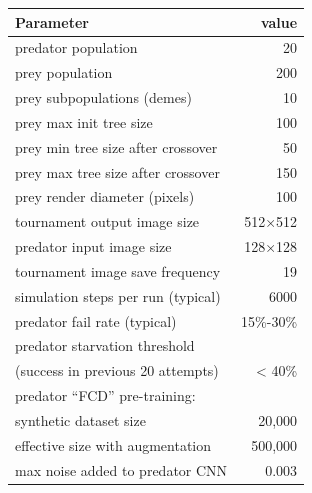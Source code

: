 \documentclass[acmtog]{acmart}
\begin{document}
\begin{adjustwidth}{1cm}{0cm}
    \vspace{0.3cm}
    \begin{tabular}{ |l|r| }
        \hline
        \textbf{Parameter} & \textbf{value} \\ 
        \hline
        predator population & 20 \\ 
        prey population & 200 \\ 
        prey subpopulations (demes) & 10 \\
        prey max init tree size & 100 \\
        prey min tree size after crossover & 50 \\
        prey max tree size after crossover & 150 \\
        \hline
        prey render diameter (pixels) & 100 \\ 
        tournament output image size & 512×512 \\ 
        predator input image size & 128×128 \\ 
        \hline
        tournament image save frequency & 19 \\
        simulation steps per run (typical) & 6000 \\
        predator fail rate (typical) & 15\%-30\% \\
        predator starvation threshold & \\
        \hspace{0.2cm}(success in previous 20 attempts) & < 40\% \\ 
        \hline
        predator “FCD” pre-training: & \\
        \hspace{0.2cm} synthetic dataset size & 20,000 \\
        \hspace{0.2cm} effective size with augmentation & 500,000 \\
        \hline
        max noise added to predator CNN & 0.003 \\
        \hline
    \end{tabular}
\end{adjustwidth}
\end{document}
